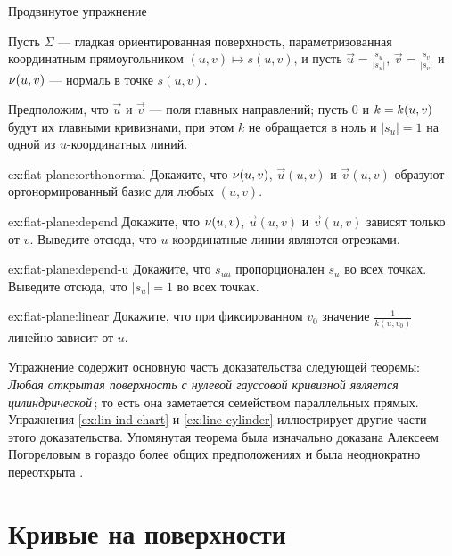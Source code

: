 \begin{thm}{Продвинутое упражнение}\label{ex:flat-plane}{\sloppy
Пусть $\Sigma$ --- гладкая ориентированная поверхность, параметризованная координатным прямоугольником $(u,v)\mapsto s(u,v)$,
и пусть $\vec u=\tfrac{s_u}{|s_u|}$, $\vec v=\tfrac{s_v}{|s_v|}$ и $\nu(u,v)$ --- нормаль в точке $s(u,v)$.

}

Предположим, что $\vec u$ и $\vec v$ --- поля главных направлений;
пусть $0$ и $k\z=k(u,v)$ будут их главными кривизнами,
при этом $k$ не обращается в ноль и $|s_u|=1$ на одной из $u$-координатных линий.

\begin{subthm}{ex:flat-plane:orthonormal}
Докажите, что $\nu(u,v)$, $\vec u(u,v)$ и $\vec v(u,v)$ образуют ортонормированный базис для любых $(u,v)$.
\end{subthm}

\begin{subthm}{ex:flat-plane:depend}
Докажите, что $\nu(u,v)$, $\vec u(u,v)$ и $\vec v(u,v)$ зависят только от $v$.
Выведите отсюда, что $u$-координатные линии являются отрезками.
\end{subthm}

\begin{subthm}{ex:flat-plane:depend-u}
Докажите, что $s_{uu}$ пропорционален $s_u$ во всех точках.
Выведите отсюда, что $|s_u|=1$ во всех точках.
\end{subthm}

\begin{subthm}{ex:flat-plane:linear}
Докажите, что при фиксированном $v_0$ значение $\tfrac1{k(u,v_0)}$ линейно зависит от $u$.
\end{subthm}

\end{thm}

Упражнение содержит основную часть доказательства следующей теоремы:
\textit{Любая открытая поверхность с нулевой гауссовой кривизной является \emph{цилиндрической}}\,;
то есть она заметается семейством параллельных прямых.
Упражнения \ref{ex:lin-ind-chart} и \ref{ex:line-cylinder} иллюстрирует другие части этого доказательства.
Упомянутая теорема была изначально доказана Алексеем Погореловым \cite[II §3 теорема 2]{pogorelov1956} в гораздо более общих предположениях и была неоднократно переоткрыта \cite{hartman-nirenberg,massey1962}.


\chapter{Кривые на поверхности}\label{chap:Curves in a surface}

